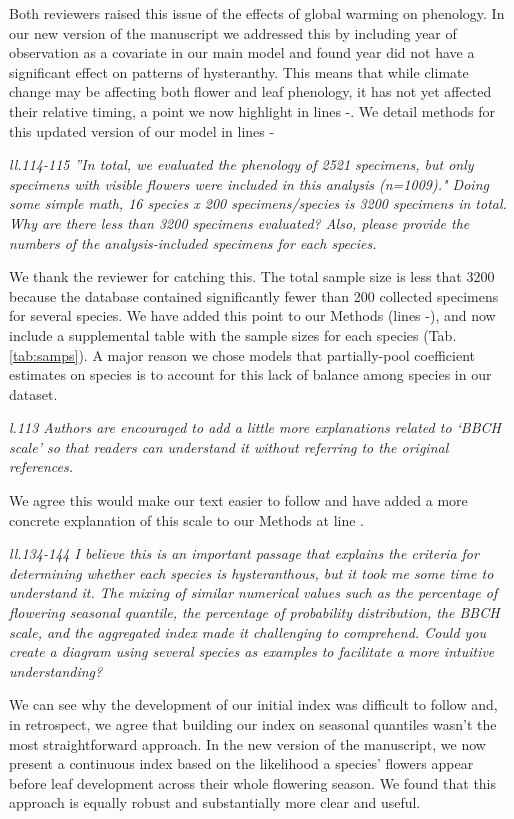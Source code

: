 \documentclass{article}[12pt]
\begin{document}
Both reviewers raised this issue of the effects of global warming on phenology. In our new version of the manuscript we addressed this by including year of observation as a covariate in our main model and found year did not have a significant effect on patterns of hysteranthy. This means that while climate change may be affecting both flower and leaf phenology, it has not yet affected their relative timing, a point we now highlight in lines -. We detail methods for this updated version of our model in lines -

\emph{ll.114-115 ''In total, we evaluated the phenology of 2521 specimens, but only specimens with visible flowers were included in this analysis (n=1009)." Doing some simple math, 16 species x 200 specimens/species is 3200 specimens in total. Why are there less than 3200 specimens evaluated? Also, please provide the numbers of the analysis-included specimens for each species.}

We thank the reviewer for catching this. The total sample size is less that 3200 because the database contained significantly fewer than 200 collected specimens for several species. We have added this point to our Methods (lines -), and now include a supplemental table with the sample sizes for each species (Tab. \ref{tab:samps}). A major reason we chose models that partially-pool coefficient estimates on species is to account for this lack of balance among species in our dataset.

\emph{l.113 Authors are encouraged to add a little more explanations related to ‘BBCH scale’ so that readers can understand it without referring to the original references.}

We agree this would make our text easier to follow and have added a more concrete explanation of this scale to our Methods at line .

\emph{ll.134-144 I believe this is an important passage that explains the criteria for determining whether each species is hysteranthous, but it took me some time to understand it. The mixing of similar numerical values such as the percentage of flowering seasonal quantile, the percentage of probability distribution, the BBCH scale, and the aggregated index made it challenging to comprehend. Could you create a diagram using several species as examples to facilitate a more intuitive understanding?}

We can see why the development of our initial index was difficult to follow and, in retrospect, we agree that building our index on seasonal quantiles wasn't the most straightforward approach.  In the new version of the manuscript, we now present a continuous index based on the likelihood a species' flowers appear before leaf development across their whole flowering season. We found that this approach is equally robust and substantially more clear and useful.
\end{document}
